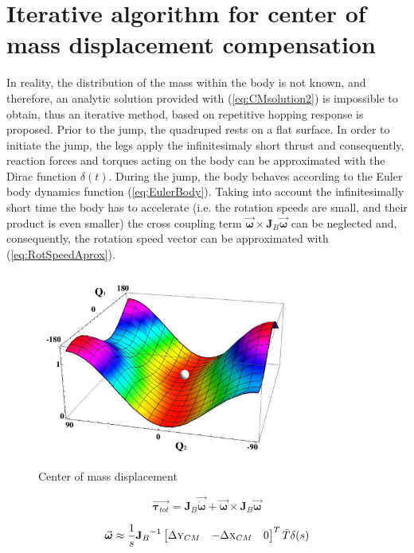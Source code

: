\section{Iterative algorithm for center of mass displacement compensation}\label{sec:Algorithm}
In reality, the distribution of the mass within the body is not known, and therefore, an analytic solution provided with (\ref{eq:CMsolution2}) is impossible to obtain, thus an iterative method, based on repetitive hopping response is proposed. Prior to the jump, the quadruped rests on a flat surface. In order to initiate the jump, the legs apply the infinitesimaly short thrust and consequently, reaction forces and torques acting on the body can be approximated with the Dirac function $\delta (t)$. During the jump, the body behaves according to the Euler body dynamics function (\ref{eq:EulerBody}). Taking into account the infinitesimally short time the body has to accelerate (i.e. the rotation speeds are small, and their product is even smaller) the cross coupling term $\vec{\boldsymbol{\omega}}\times \textbf{J}_B\vec{\boldsymbol{\omega}}$ can be neglected and, consequently, the rotation speed vector can be approximated with (\ref{eq:RotSpeedAprox}).
\begin{figure}[!t]
	\centering
	\includegraphics[width=85mm]{./pictures/RobinRepicCM.pdf}
	\caption{Center of mass displacement}
	\label{fig:CM3Dfunction}
\end{figure}

\begin{equation}\label{eq:EulerBody}
\vec{\boldsymbol{\tau}_{tot}}=\textbf{J}_B\vec{\dot{\boldsymbol{\omega}}}+\vec{\boldsymbol{\omega}}\times \textbf{J}_B\vec{\boldsymbol{\omega}}
\end{equation}

\begin{equation}\label{eq:RotSpeedAprox}
\vec{\boldsymbol{\omega}}\approx \frac{1}{s}{\textbf{J}_B}^{-1}\begin{bmatrix}
\Delta \textsc{y}_{CM} & -\Delta \textsc{x}_{CM} & 0
\end{bmatrix}^T\bar{T}\delta(s)
\end{equation}

